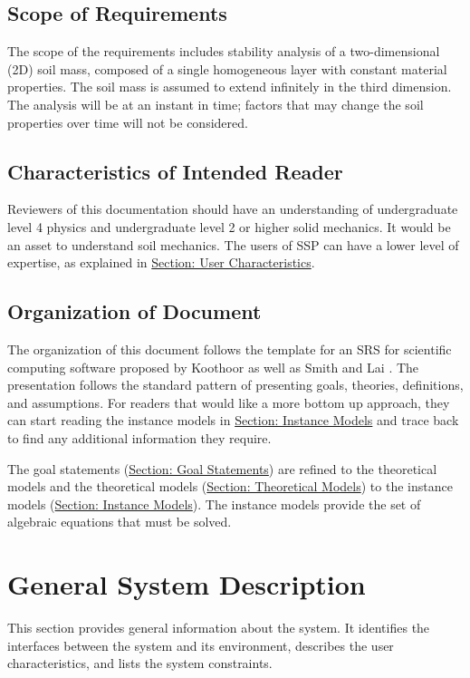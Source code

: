 \documentclass[12pt]{article}
\begin{document}
\subsection{Scope of Requirements}
\label{Sec:ReqsScope}
The scope of the requirements includes stability analysis of a two-dimensional (2D) soil mass, composed of a single homogeneous layer with constant material properties. The soil mass is assumed to extend infinitely in the third dimension. The analysis will be at an instant in time; factors that may change the soil properties over time will not be considered.

\subsection{Characteristics of Intended Reader}
\label{Sec:ReaderChars}
Reviewers of this documentation should have an understanding of undergraduate level 4 physics and undergraduate level 2 or higher solid mechanics. It would be an asset to understand soil mechanics. The users of SSP can have a lower level of expertise, as explained in \hyperref[Sec:UserChars]{Section: User Characteristics}.

\subsection{Organization of Document}
\label{Sec:DocOrg}
The organization of this document follows the template for an SRS for scientific computing software proposed by Koothoor \cite{koothoor2013} as well as Smith and Lai \cite{smithLai2005}. The presentation follows the standard pattern of presenting goals, theories, definitions, and assumptions. For readers that would like a more bottom up approach, they can start reading the instance models in \hyperref[Sec:IMs]{Section: Instance Models} and trace back to find any additional information they require.

The goal statements (\hyperref[Sec:GoalStmt]{Section: Goal Statements}) are refined to the theoretical models and the theoretical models (\hyperref[Sec:TMs]{Section: Theoretical Models}) to the instance models (\hyperref[Sec:IMs]{Section: Instance Models}). The instance models provide the set of algebraic equations that must be solved.

\section{General System Description}
\label{Sec:GenSysDesc}
This section provides general information about the system. It identifies the interfaces between the system and its environment, describes the user characteristics, and lists the system constraints.
\end{document}
